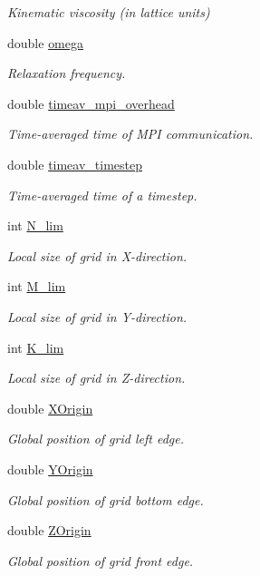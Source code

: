 \begin{DoxyCompactItemize}
\begin{DoxyCompactList}\small\item\em Kinematic viscosity (in lattice units) \end{DoxyCompactList}\item 
double \hyperlink{class_grid_obj_a21461e5d39c5ae83ae42170c829e9da3}{omega}
\begin{DoxyCompactList}\small\item\em Relaxation frequency. \end{DoxyCompactList}\item 
double \hyperlink{class_grid_obj_a147cfb80b653ca4432432e8185cf38ef}{timeav\+\_\+mpi\+\_\+overhead}
\begin{DoxyCompactList}\small\item\em Time-\/averaged time of M\+PI communication. \end{DoxyCompactList}\item 
double \hyperlink{class_grid_obj_a2ad670e6b9bdd28b5060397800170310}{timeav\+\_\+timestep}
\begin{DoxyCompactList}\small\item\em Time-\/averaged time of a timestep. \end{DoxyCompactList}\item 
int \hyperlink{class_grid_obj_a5eb35752a7c0741510975d9ee6aa3ce1}{N\+\_\+lim}
\begin{DoxyCompactList}\small\item\em Local size of grid in X-\/direction. \end{DoxyCompactList}\item 
int \hyperlink{class_grid_obj_a01d3f362634c896ecdb80f0e6304c12f}{M\+\_\+lim}
\begin{DoxyCompactList}\small\item\em Local size of grid in Y-\/direction. \end{DoxyCompactList}\item 
int \hyperlink{class_grid_obj_aaccc404f2fbdbaef8c5dd134f7d9e17f}{K\+\_\+lim}
\begin{DoxyCompactList}\small\item\em Local size of grid in Z-\/direction. \end{DoxyCompactList}\item 
double \hyperlink{class_grid_obj_adcd2bcbd5bb4009d7c84097e1356a1fa}{X\+Origin}
\begin{DoxyCompactList}\small\item\em Global position of grid left edge. \end{DoxyCompactList}\item 
double \hyperlink{class_grid_obj_a30c070fe26def1366db2b3e66b3cd29d}{Y\+Origin}
\begin{DoxyCompactList}\small\item\em Global position of grid bottom edge. \end{DoxyCompactList}\item 
double \hyperlink{class_grid_obj_a69d43fd31ba7edd4fc9f02eb0c0fcefd}{Z\+Origin}
\begin{DoxyCompactList}\small\item\em Global position of grid front edge. \end{DoxyCompactList}\end{DoxyCompactItemize}
